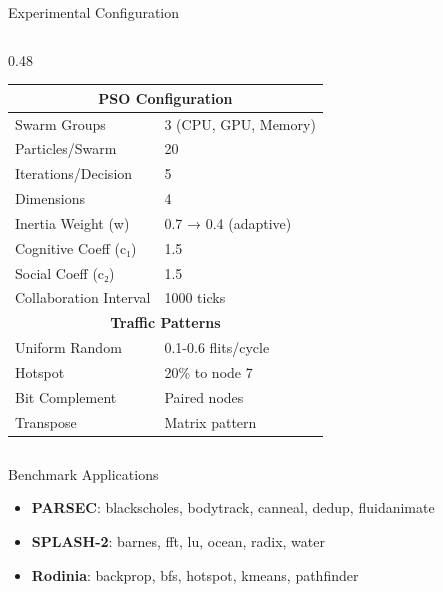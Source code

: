 \documentclass[10pt,aspectratio=169]{beamer}
\begin{document}
\begin{frame}{Experimental Configuration}
\begin{columns}[T]
        \begin{column}{0.48\textwidth}
            \begin{table}[h]
                \centering
                \footnotesize
                \begin{tabular}{|l|l|}
                    \hline
                    \multicolumn{2}{|c|}{\textbf{PSO Configuration}} \\
                    \hline
                    Swarm Groups & 3 (CPU, GPU, Memory) \\
                    Particles/Swarm & 20 \\
                    Iterations/Decision & 5 \\
                    Dimensions & 4 \\
                    Inertia Weight (w) & 0.7 → 0.4 (adaptive) \\
                    Cognitive Coeff (c₁) & 1.5 \\
                    Social Coeff (c₂) & 1.5 \\
                    Collaboration Interval & 1000 ticks \\
                    \hline
                    \multicolumn{2}{|c|}{\textbf{Traffic Patterns}} \\
                    \hline
                    Uniform Random & 0.1-0.6 flits/cycle \\
                    Hotspot & 20\% to node 7 \\
                    Bit Complement & Paired nodes \\
                    Transpose & Matrix pattern \\
                    \hline
                \end{tabular}
            \end{table}
        \end{column}
    \end{columns}
    
    \begin{block}{Benchmark Applications}
        \begin{itemize}
            \item \textbf{PARSEC}: blackscholes, bodytrack, canneal, dedup, fluidanimate
            \item \textbf{SPLASH-2}: barnes, fft, lu, ocean, radix, water
            \item \textbf{Rodinia}: backprop, bfs, hotspot, kmeans, pathfinder
        \end{itemize}
    \end{block}
\end{frame}
\end{document}
